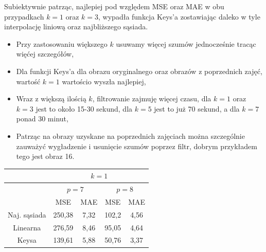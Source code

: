 \documentclass[14pt]{article}
\begin{document}
\begin{center}
    \vspace{0.2cm}

    Subiektywnie patrząc, najlepiej pod względem MSE oraz MAE w obu
    przypadkach $k=1$ oraz $k=3$, wypadła funkcja Keys'a
    zostawiając daleko w tyle
    interpolację liniową oraz najbliższego sąsiada.

    \begin{itemize}
        \item Przy zastosowaniu większego $k$ 
        usuwamy więcej szumów jednocześnie tracąc więćej szczegółów,
        \item Dla funkcji Keys'a dla obrazu oryginalnego 
        oraz obrazów z poprzednich zajęć, wartość $k=1$ wartościo wyszła
        najlepiej,
        \item Wraz z większą ilością $k$, filtrowanie zajmuję więcej czasu,
        dla $k=1$ oraz $k=3$ jest to około 15-30 sekund, dla $k=5$ jest to już
        70 sekund, a dla $k=7$ ponad 30 minut,
        \item Patrząc na obrazy uzyskane na poprzednich zajęciach można
        szczególnie zauważyć wygładzenie i usunięcie szumów poprzez filtr, 
        dobrym przykładem tego jest obraz 16.
    \end{itemize}


    \vspace{1.25cm}
    \begin{tabular}{|c|c|c|c|c|}
        \hline
        & \multicolumn{4}{|c|}{$k=1$} \\ \hline
        & \multicolumn{2}{|c|}{$p=7$} & \multicolumn{2}{|c|}{$p=8$} \\ \hline

        & MSE & MAE & MSE & MAE \\ \hline
        Naj. sąsiada 
        & 250,38 & 7,32 %
        & 102,2 & 4,56 \\ \hline %
        Linearna 
        & 276,59 & 8,46 %
        & 95,05 & 4,64 \\ \hline %
        Keysa 
        & 139,61 & 5,88 %
        & 50,76 & 3,37 \\ \hline %


\end{tabular}
\end{center}
\end{document}
